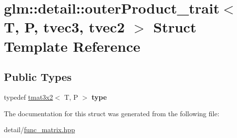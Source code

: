 \hypertarget{structglm_1_1detail_1_1outerProduct__trait_3_01T_00_01P_00_01tvec3_00_01tvec2_01_4}{\section{glm\-:\-:detail\-:\-:outer\-Product\-\_\-trait$<$ T, P, tvec3, tvec2 $>$ Struct Template Reference}
\label{structglm_1_1detail_1_1outerProduct__trait_3_01T_00_01P_00_01tvec3_00_01tvec2_01_4}
}
\subsection*{Public Types}
\begin{DoxyCompactItemize}
\item 
\hypertarget{structglm_1_1detail_1_1outerProduct__trait_3_01T_00_01P_00_01tvec3_00_01tvec2_01_4_a241608939fa083f2ddb7c701be75a732}{typedef \hyperlink{structglm_1_1tmat3x2}{tmat3x2}$<$ T, P $>$ {\bfseries type}}\label{structglm_1_1detail_1_1outerProduct__trait_3_01T_00_01P_00_01tvec3_00_01tvec2_01_4_a241608939fa083f2ddb7c701be75a732}

\end{DoxyCompactItemize}


The documentation for this struct was generated from the following file\-:\begin{DoxyCompactItemize}
\item 
detail/\hyperlink{func__matrix_8hpp}{func\-\_\-matrix.\-hpp}\end{DoxyCompactItemize}
